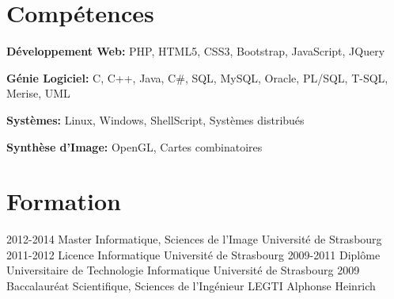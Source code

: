 \documentclass[]{friggeri-cv} %
\begin{document}

\section{Compétences}

\textbf{Développement Web:}
PHP, HTML5, CSS3, Bootstrap, JavaScript, JQuery

\textbf{Génie Logiciel:}
C, C++, Java, C\#, SQL, MySQL, Oracle, PL/SQL, T-SQL, Merise, UML

\textbf{Systèmes:}
Linux, Windows, ShellScript, Systèmes distribués

\textbf{Synthèse d'Image:}
OpenGL, Cartes combinatoires

\section{Formation}

\begin{entrylist}
\entry
{2012-2014}
{Master {\normalfont Informatique, Sciences de l'Image}}
{Université de Strasbourg}
{}
\entry
{2011-2012}
{Licence {\normalfont Informatique}}
{Université de Strasbourg}
{}
\entry
{2009-2011}
{Diplôme Universitaire de Technologie {\normalfont Informatique}}
{Université de Strasbourg}
{}
\entry
{2009}
{Baccalauréat {\normalfont Scientifique, Sciences de l'Ingénieur}}
{LEGTI Alphonse Heinrich}
{}
\end{entrylist}

\end{document}

